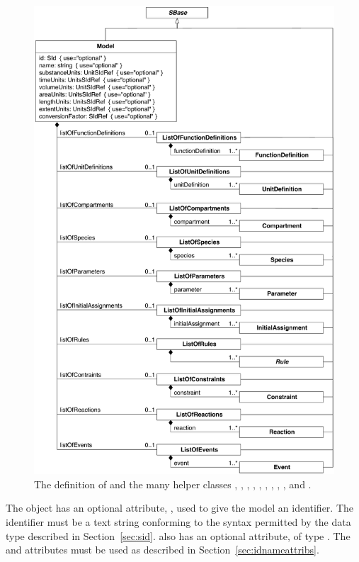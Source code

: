 \begin{figure}[htb]
  \centering
  \includegraphics[scale=0.76]{figs/model-uml}
  \caption{The definition of \Model and the many helper
      classes \ListOfFunctionDefinitions, \ListOfUnitDefinitions,
      \ListOfCompartments, \ListOfSpecies, \ListOfParameters,
      \ListOfInitialAssignments, \ListOfRules, \ListOfConstraints,
      \ListOfReactions, and \ListOfEvents.}
  \label{fig:model}
\end{figure}

The \Model object has an optional attribute, , used to
give the model an identifier.  The identifier must be a text
string conforming to the syntax permitted by the 
data type described in Section~\ref{sec:sid}.  \Model also has an
optional  attribute, of type .  The
 and  attributes must be used as described in
Section~\ref{sec:idnameattribs}.

